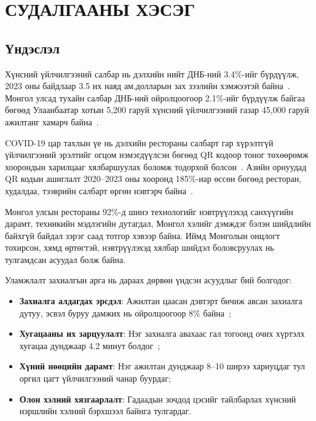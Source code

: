 \chapter{СУДАЛГААНЫ ХЭСЭГ}
\label{ch1}

\section{Үндэслэл}

Хүнсний үйлчилгээний салбар нь дэлхийн нийт ДНБ-ний 3.4\%-ийг бүрдүүлж, 2023 оны
байдлаар 3.5 их наяд ам.долларын зах зээлийн хэмжээтэй байна~\cite{statista2023}.
Монгол улсад тухайн салбар ДНБ-ний ойролцоогоор 2.1\%-ийг бүрдүүлж байгаа бөгөөд
Улаанбаатар хотын 5,200 гаруй хүнсний үйлчилгээний газар 45,000 гаруй ажилтанг
хамарч байна~\cite{mrhba2023}.

COVID-19 цар тахлын үе нь дэлхийн рестораны салбарт гар хүрэлтгүй үйлчилгээний
эрэлтийг огцом нэмэгдүүлсэн бөгөөд QR кодоор тоног төхөөрөмж хоорондын харилцааг
хялбаршуулах боломж тодорхой болсон~\cite{gossling2022}. Азийн орнуудад QR кодын
ашиглалт 2020--2023 оны хооронд 185\%-иар өссөн бөгөөд ресторан, худалдаа, тээврийн
салбарт өргөн нэвтэрч байна~\cite{juniper2023}.

Монгол улсын рестораны 92\%-д шинэ технологийг нэвтрүүлэхэд санхүүгийн дарамт,
техникийн мэдлэгийн дутагдал, Монгол хэлийг дэмждэг бэлэн шийдлийн байхгүй байдал
зэрэг саад тотгор хэвээр байна. Иймд Монголын онцлогт тохирсон, хямд өртөгтэй,
нэвтрүүлэхэд хялбар шийдэл боловсруулах нь тулгамдсан асуудал болж байна.

Уламжлалт захиалгын арга нь дараах дөрвөн үндсэн асуудлыг бий болгодог:
\begin{itemize}
  \item \textbf{Захиалга алдагдах эрсдэл}: Ажилтан цаасан дэвтэрт бичиж авсан захиалга
    дутуу, эсвэл буруу дамжих нь ойролцоогоор 8\% байна~\cite{pos2022};
  \item \textbf{Хугацааны их зарцуулалт}: Нэг захиалга авахаас гал тогоонд очих хүртэлх
    хугацаа дунджаар 4.2 минут болдог~\cite{pos2022};
  \item \textbf{Хүний нөөцийн дарамт}: Нэг ажилтан дунджаар 8--10 ширээ хариуцдаг тул
    оргил цагт үйлчилгээний чанар буурдаг;
  \item \textbf{Олон хэлний хязгаарлалт}: Гадаадын зочдод цэсийг тайлбарлах хүнсний
    нэршлийн хэлний бэрхшээл байнга тулгардаг.
\end{itemize}

